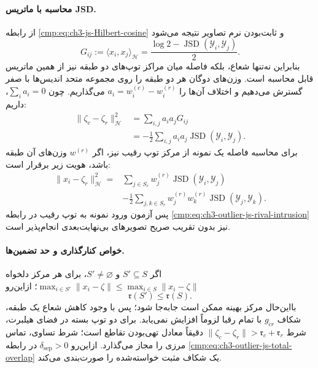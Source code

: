 \paragraph{محاسبه با ماتریس JSD.}
از رابطه
\eqref{cmp:eq:ch3-js-Hilbert-cosine}
و ثابت‌بودن نرم تصاویر نتیجه می‌شود
\begin{equation}\label{eq:app-ch3-js-meb-gram}
G_{ij}
:=\langle x_i,x_j\rangle_{\mathcal H}
=\frac{\log2-\operatorname{JSD}
(\mathscr Y_i,\mathscr Y_j)}{2}.
\end{equation}
بنابراین نه‌تنها شعاع،
بلکه فاصله میان مراکز توپ‌های
دو طبقه نیز از همین ماتریس
قابل محاسبه است. وزن‌های دوگان
هر دو طبقه را روی مجموعه
متحد اندیس‌ها با صفر گسترش
می‌دهیم و اختلاف آن‌ها را
$a_i=w_i^{(c)}-w_i^{(r)}$
می‌گذاریم. چون
$\sum_ia_i=0$، داریم:
\begin{equation}\label{eq:app-ch3-js-meb-center-distance}
\boxed{
\begin{aligned}
\|\zeta_c-\zeta_r\|_{\mathcal H}^2
&=\sum_{i,j}a_i a_jG_{ij}\\
&=-\frac12\sum_{i,j}a_i a_j
\operatorname{JSD}
(\mathscr Y_i,\mathscr Y_j).
\end{aligned}}
\end{equation}
برای محاسبه فاصله یک نمونه
از مرکز توپ رقیب نیز،
اگر $w^{(r)}$ وزن‌های آن
طبقه باشد، هویت زیر برقرار است:
\begin{equation}\label{eq:app-ch3-js-meb-point-to-center}
\begin{aligned}
\|x_i-\zeta_r\|_{\mathcal H}^2
={}&\sum_{j\in S_r}
w_j^{(r)}\operatorname{JSD}
(\mathscr Y_i,\mathscr Y_j)\\
&-\frac12\sum_{j,k\in S_r}
w_j^{(r)}w_k^{(r)}
\operatorname{JSD}
(\mathscr Y_j,\mathscr Y_k).
\end{aligned}
\end{equation}
پس آزمون ورود نمونه به توپ
رقیب در رابطه
\eqref{cmp:eq:ch3-outlier-js-rival-intrusion}
نیز بدون تقریب صریح تصویرهای
بی‌نهایت‌بعدی انجام‌پذیر است.

\paragraph{خواص کنارگذاری و حد تضمین‌ها.}
اگر $S'\subseteq S$ و $S'\ne\varnothing$،
برای هر مرکز دلخواه
$\max_{i\in S'}\|x_i-\zeta\|
\le\max_{i\in S}\|x_i-\zeta\|$؛
ازاین‌رو
\begin{equation}\label{eq:app-ch3-js-meb-removal-monotonicity}
\mathfrak r(S')\le\mathfrak r(S).
\end{equation}
بااین‌حال مرکز بهینه ممکن است
جابه‌جا شود؛ پس با وجود
کاهش شعاع یک طبقه،
شکاف $g_{cr}$ با تمام رقبا
لزوماً افزایش نمی‌یابد.
برای دو توپ بسته در فضای هیلبرت،
شرط
$\|\zeta_c-\zeta_r\|
>\mathfrak r_c+\mathfrak r_r$
دقیقاً معادل تهی‌بودن تقاطع است؛
شرط تساوی، تماس مرزی را
مجاز می‌گذارد. ازاین‌رو
$\delta_{\mathrm{sep}}>0$
در رابطه
\eqref{cmp:eq:ch3-outlier-js-total-overlap}
یک شکاف مثبت خواسته‌شده
را صورت‌بندی می‌کند.

